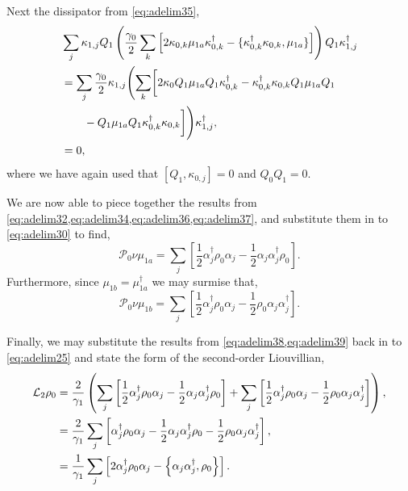 Next the dissipator from \cref{eq:adelim35}, 
\begin{align}
	&\sum_{j} \kappa_{1,j}Q_{1}\left( \frac{\gamma_{0}}{2} \sum_{k}\left[ 2\kappa_{0,k}\mu_{1a}\kappa_{0,k}^{\dagger} - \{\kappa_{0,k}^{\dagger}\kappa_{0,k}, \mu_{1a}\}\right]  \right)Q_{1}\kappa_{1,j}^{\dagger} \notag \\
	&= \sum_{j} \frac{\gamma_{0}}{2} \kappa_{1,j} \Biggl(\sum_{k} \biggl[ 2\kappa_{0}Q_{1}\mu_{1a}Q_{1}\kappa_{0,k}^{\dagger} - \kappa_{0,k}^{\dagger}\kappa_{0,k}Q_{1}\mu_{1a}Q_{1} \notag \\
	&\qquad - Q_{1}\mu_{1a}Q_{1}\kappa_{0,k}^{\dagger}\kappa_{0,k} \bigg] \Biggr)\kappa_{1,j}^{\dagger}, \notag \\
	&= 0,
	\label{eq:adelim37}
\end{align}
where we have again used that \([Q_{1}, \kappa_{0,j}] = 0\) and \(Q_{0}Q_{1} = 0\).

We are now able to piece together the results from \cref{eq:adelim32,eq:adelim34,eq:adelim36,eq:adelim37}, and substitute them in to \cref{eq:adelim30} to find,
\begin{equation}
	\mathcal{P}_{0}\nu\mu_{1a} = \sum_{j} \left[ \frac{1}{2} \alpha_{j}^{\dagger}\rho_{0}\alpha_{j} - \frac{1}{2}\alpha_{j}\alpha_{j}^{\dagger}\rho_{0} \right].
	\label{eq:adelim38}
\end{equation}
Furthermore, since \(\mu_{1b} = \mu_{1a}^{\dagger}\) we may surmise that,
\begin{equation}
	\mathcal{P}_{0}\nu\mu_{1b} = \sum_{j} \left[ \frac{1}{2} \alpha_{j}^{\dagger}\rho_{0}\alpha_{j} - \frac{1}{2}\rho_{0}\alpha_{j}\alpha_{j}^{\dagger} \right].
	\label{eq:adelim39}
\end{equation}

Finally, we may substitute the results from \cref{eq:adelim38,eq:adelim39} back in to \cref{eq:adelim25} and state the form of the second-order Liouvillian,
\begin{align}
	\mathcal{L}_{2}\rho_{0} &= \frac{2}{\gamma_{1}} \left(\sum_{j} \left[ \frac{1}{2} \alpha_{j}^{\dagger}\rho_{0}\alpha_{j} - \frac{1}{2}\alpha_{j}\alpha_{j}^{\dagger}\rho_{0} \right] + \sum_{j} \left[ \frac{1}{2} \alpha_{j}^{\dagger}\rho_{0}\alpha_{j} - \frac{1}{2}\rho_{0}\alpha_{j}\alpha_{j}^{\dagger} \right]\right), \notag \\
	&= \frac{2}{\gamma_{1}} \sum_{j} \left[ \alpha_{j}^{\dagger}\rho_{0}\alpha_{j} - \frac{1}{2}\alpha_{j}\alpha_{j}^{\dagger}\rho_{0} - \frac{1}{2}\rho_{0}\alpha_{j}\alpha_{j}^{\dagger}\right], \notag \\
	&= \frac{1}{\gamma_{1}}\sum_{j} \left[ 2\alpha_{j}^{\dagger}\rho_{0}\alpha_{j} - \left\{ \alpha_{j}\alpha_{j}^{\dagger}, \rho_{0}\right\} \right].
	\label{eq:adelim40}
\end{align} 

